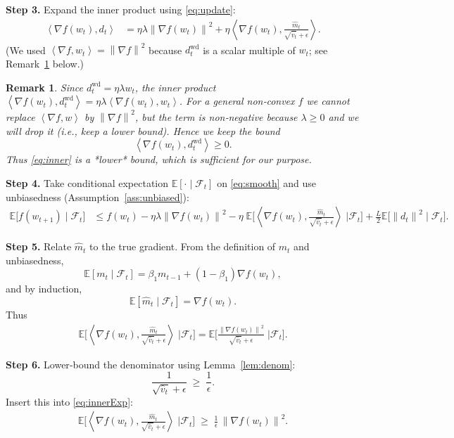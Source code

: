\documentclass{article}
\newtheorem{remark}{Remark}
\newcommand{\E}{\mathbb{E}}
\newcommand{\norm}[1]{\left\|#1\right\|}
\newcommand{\ip}[2]{\left\langle #1,#2\right\rangle}
\begin{document}
\noindent\textbf{Step 3.} Expand the inner product using \eqref{eq:update}:
\begin{align}
\ip{\nabla f(w_{t})}{d_{t}}
&= \eta\lambda \norm{\nabla f(w_{t})}^{2}
   + \eta\ip{\nabla f(w_{t})}{\frac{\hat m_{t}}{\sqrt{\hat v_{t}}+\epsilon}}.
\label{eq:inner}
\end{align}
(We used $\ip{\nabla f}{w_{t}} = \norm{\nabla f}^{2}$ because $d_{t}^{\text{wd}}$ is a scalar multiple of $w_{t}$; see Remark~\ref{rem:wd} below.)

\begin{remark}\label{rem:wd}
Since $d_{t}^{\text{wd}} = \eta\lambda w_{t}$, the inner product $\ip{\nabla f(w_{t})}{d_{t}^{\text{wd}}}= \eta\lambda\ip{\nabla f(w_{t})}{w_{t}}$.  
For a general non‑convex $f$ we cannot replace $\ip{\nabla f}{w}$ by $\norm{\nabla f}^{2}$, but the term is non‑negative because $\lambda\ge0$ and we will drop it (i.e., keep a lower bound).  Hence we keep the bound
\[
\ip{\nabla f(w_{t})}{d_{t}^{\text{wd}}}\ge 0 .
\]
Thus \eqref{eq:inner} is a *lower* bound, which is sufficient for our purpose.
\end{remark}

\noindent\textbf{Step 4.} Take conditional expectation $\E[\cdot\mid\mathcal{F}_{t}]$ on \eqref{eq:smooth} and use unbiasedness (Assumption~\ref{ass:unbiased}):
\begin{align}
\E\!\big[f(w_{t+1})\mid\mathcal{F}_{t}\big]
&\le f(w_{t}) - \eta\lambda \norm{\nabla f(w_{t})}^{2}
   - \eta\;\E\!\Big[\ip{\nabla f(w_{t})}{\frac{\hat m_{t}}{\sqrt{\hat v_{t}}+\epsilon}}\;\Big|\mathcal{F}_{t}\Big]
   + \frac{L}{2}\E\!\big[\norm{d_{t}}^{2}\mid\mathcal{F}_{t}\big].
\label{eq:cond}
\end{align}

\noindent\textbf{Step 5.} Relate $\hat m_{t}$ to the true gradient.
From the definition of $m_{t}$ and unbiasedness,
\[
\E[m_{t}\mid\mathcal{F}_{t}]
   = \beta_{1} m_{t-1} + (1-\beta_{1})\nabla f(w_{t}),
\]
and by induction,
\[
\E[\hat m_{t}\mid\mathcal{F}_{t}]
   = \nabla f(w_{t}).
\]
Thus
\begin{align}
\E\!\Big[\ip{\nabla f(w_{t})}{\frac{\hat m_{t}}{\sqrt{\hat v_{t}}+\epsilon}}\;\Big|\mathcal{F}_{t}\Big]
= \E\!\Big[\frac{\norm{\nabla f(w_{t})}^{2}}{\sqrt{\hat v_{t}}+\epsilon}\;\Big|\mathcal{F}_{t}\Big].
\label{eq:innerExp}
\end{align}

\noindent\textbf{Step 6.} Lower‑bound the denominator using Lemma~\ref{lem:denom}:
\[
\frac{1}{\sqrt{\hat v_{t}}+\epsilon}\;\ge\;\frac{1}{\epsilon}.
\]
Insert this into \eqref{eq:innerExp}:
\begin{align}
\E\!\Big[\ip{\nabla f(w_{t})}{\frac{\hat m_{t}}{\sqrt{\hat v_{t}}+\epsilon}}\;\Big|\mathcal{F}_{t}\Big]
\;\ge\;
\frac{1}{\epsilon}\,\norm{\nabla f(w_{t})}^{2}.
\label{eq:denomLow}
\end{align}
\end{document}
